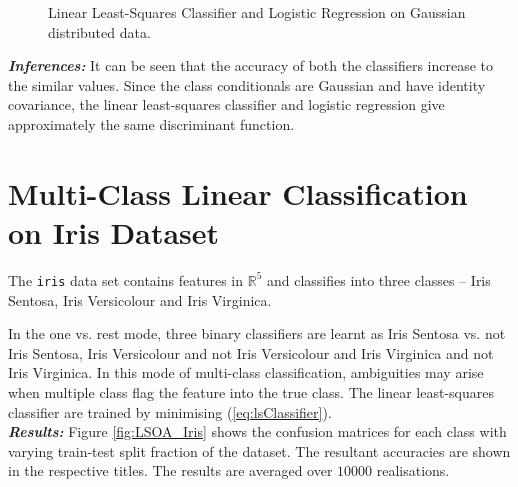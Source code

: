 \documentclass[12pt, a4 paper]{article}
\newcommand{\rr}{\mathbb{R}}
\begin{document}
\begin{figure}
\caption{Linear Least-Squares Classifier and Logistic Regression on Gaussian distributed data.}
\label{fig:LS_LOG_Gaussian}
\end{figure}

{\it \bfseries Inferences:} It can be seen that the accuracy of both the classifiers increase to the similar values. Since the class conditionals are Gaussian and have identity covariance, the linear least-squares classifier and logistic regression give approximately the same discriminant function. \\


\section{Multi-Class Linear Classification on Iris Dataset}
\label{sec:bayes20D}

The \texttt{iris} data set contains features in $\rr^{5}$ and classifies into three classes -- Iris Sentosa, Iris Versicolour and Iris Virginica.

\label{prob:2.i}

In the one vs. rest mode, three binary classifiers are learnt as Iris Sentosa vs. not Iris Sentosa, Iris Versicolour and not Iris Versicolour and Iris Virginica and not Iris Virginica. In this mode of multi-class classification, ambiguities may arise when multiple class flag the feature into the true class. The linear least-squares classifier are trained by minimising (\ref{eq:lsClassifier}). \\

{\it \bfseries Results:} Figure \ref{fig:LSOA_Iris} shows the confusion matrices for each class with varying train-test split fraction of the dataset. The resultant accuracies are shown in the respective titles. The results are averaged over $10000$ realisations. \\
\end{document}
